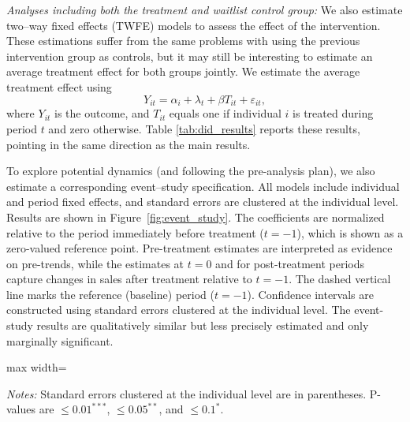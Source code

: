 \documentclass[12pt]{article}
\begin{document}
\textit{Analyses including both the treatment and waitlist control group:} We also estimate two--way fixed effects (TWFE) models to assess the effect of the intervention. These estimations suffer from the same problems with using the previous intervention group as controls, but it may still be interesting to estimate an average treatment effect for both groups jointly. We estimate the average treatment effect using
\begin{equation}
    Y_{it} = \alpha_i + \lambda_t + \beta T_{it} + \varepsilon_{it},
    \label{eq:twfe}
\end{equation}
where $Y_{it}$ is the outcome, and $T_{it}$ equals one if individual $i$ is treated during period $t$ and zero otherwise. Table \ref{tab:did_results} reports these results, pointing in the same direction as the main results.

To explore potential dynamics (and following the pre-analysis plan), we also estimate a corresponding event--study specification. All models include individual and period fixed effects, and standard errors are clustered at the individual level. Results are shown in Figure~\ref{fig:event_study}. The coefficients are normalized relative to the period immediately before treatment ($t=-1$), which is shown as a zero-valued reference point. Pre-treatment estimates are interpreted as evidence on pre-trends, while the estimates at $t=0$ and for post-treatment periods capture changes in sales after treatment relative to $t=-1$. The dashed vertical line marks the reference (baseline) period ($t=-1$). Confidence intervals are constructed using standard errors clustered at the individual level. The event-study results are qualitatively similar but less precisely estimated and only marginally significant.

\addtocounter{table}{-1}
\begin{table}[H]
\caption{\label{fig/event_study}Two-way fixed effects estimates}
\label{tab:did_results}
\centering

\begin{adjustbox}{max width=\textwidth}
  \begin{threeparttable}

    \begingroup
    \small %
    
    \endgroup

    \begin{tablenotes}[flushleft] %
    \small
    \item \textit{Notes:} Standard errors clustered at the individual level are in parentheses. 
    P-values are $\leq 0.01^{***}$,  $\leq 0.05^{**}$, and $\leq 0.1^{*}$.
    \end{tablenotes}

  \end{threeparttable}
\end{adjustbox}

\end{table}
\end{document}
